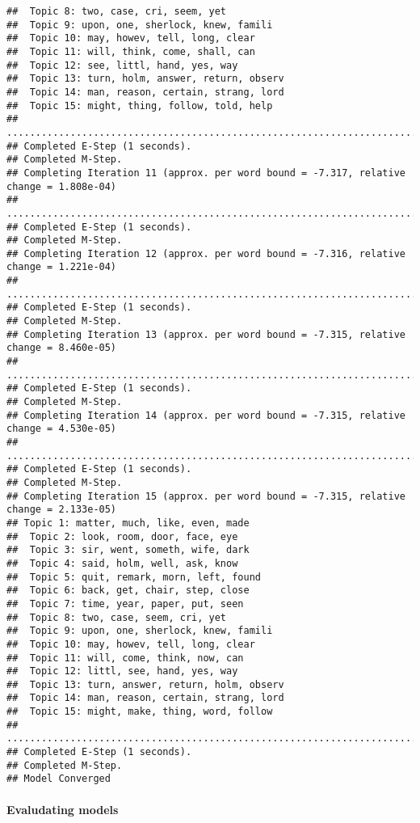 \documentclass[
]{book}
\begin{document}
\begin{verbatim}
##  Topic 8: two, case, cri, seem, yet 
##  Topic 9: upon, one, sherlock, knew, famili 
##  Topic 10: may, howev, tell, long, clear 
##  Topic 11: will, think, come, shall, can 
##  Topic 12: see, littl, hand, yes, way 
##  Topic 13: turn, holm, answer, return, observ 
##  Topic 14: man, reason, certain, strang, lord 
##  Topic 15: might, thing, follow, told, help 
## ....................................................................................................
## Completed E-Step (1 seconds). 
## Completed M-Step. 
## Completing Iteration 11 (approx. per word bound = -7.317, relative change = 1.808e-04) 
## ....................................................................................................
## Completed E-Step (1 seconds). 
## Completed M-Step. 
## Completing Iteration 12 (approx. per word bound = -7.316, relative change = 1.221e-04) 
## ....................................................................................................
## Completed E-Step (1 seconds). 
## Completed M-Step. 
## Completing Iteration 13 (approx. per word bound = -7.315, relative change = 8.460e-05) 
## ....................................................................................................
## Completed E-Step (1 seconds). 
## Completed M-Step. 
## Completing Iteration 14 (approx. per word bound = -7.315, relative change = 4.530e-05) 
## ....................................................................................................
## Completed E-Step (1 seconds). 
## Completed M-Step. 
## Completing Iteration 15 (approx. per word bound = -7.315, relative change = 2.133e-05) 
## Topic 1: matter, much, like, even, made 
##  Topic 2: look, room, door, face, eye 
##  Topic 3: sir, went, someth, wife, dark 
##  Topic 4: said, holm, well, ask, know 
##  Topic 5: quit, remark, morn, left, found 
##  Topic 6: back, get, chair, step, close 
##  Topic 7: time, year, paper, put, seen 
##  Topic 8: two, case, seem, cri, yet 
##  Topic 9: upon, one, sherlock, knew, famili 
##  Topic 10: may, howev, tell, long, clear 
##  Topic 11: will, come, think, now, can 
##  Topic 12: littl, see, hand, yes, way 
##  Topic 13: turn, answer, return, holm, observ 
##  Topic 14: man, reason, certain, strang, lord 
##  Topic 15: might, make, thing, word, follow 
## ....................................................................................................
## Completed E-Step (1 seconds). 
## Completed M-Step. 
## Model Converged
\end{verbatim}

\hypertarget{evaludating-models}{%
\paragraph{Evaludating models}\label{evaludating-models}}
\end{document}
